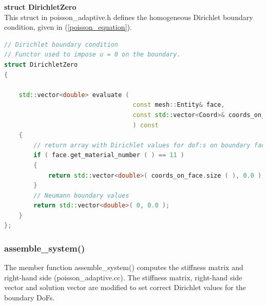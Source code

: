 \documentclass[a4paper, 11pt, twoside]{article}
\begin{document}
\textbf{struct DirichletZero} \label{structDirichletZero}\\
This struct in poisson\_adaptive.h defines the homogeneous Dirichlet boundary condition, given in (\ref{poisson_equation}).
\begin{lstlisting}[language=C++, basicstyle={\footnotesize, \ttfamily}, keywordstyle=\color{blue}, numbers=none, tabsize=4]
// Dirichlet boundary condition
// Functor used to impose u = 0 on the boundary.
struct DirichletZero
{

    std::vector<double> evaluate (
                                   const mesh::Entity& face,
                                   const std::vector<Coord>& coords_on_face
                                   ) const
    {
        // return array with Dirichlet values for dof:s on boundary face
        if ( face.get_material_number ( ) == 11 )
        {
            return std::vector<double>( coords_on_face.size ( ), 0.0 );
        }
        // Neumann boundary values
        return std::vector<double>( 0, 0.0 );
    }
};
\end{lstlisting}

\subsubsection{assemble\_system()}
The member function assemble\_system() computes the stiffness matrix and right-hand side (poisson\_adaptive.cc). The stiffness matrix, right-hand side vector and solution vector are modified to set correct Dirichlet values for the boundary DoFs.
\end{document}
